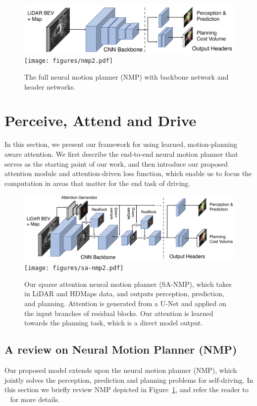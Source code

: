 \begin{figure}[t]
  \centering
  \iflatexml
  \includegraphics[width=6\textwidth]{figures/nmp2.png}
  \else
  \texttt{[image: figures/nmp2.pdf]}
  \fi
  \caption{\small The full neural motion planner (NMP) \cite{nmp} with backbone network and header networks.}
  \label{fig:nmp}
  \vspace{-0.15in}
\end{figure}
\section{Perceive, Attend and Drive}
In this section, we present our framework for using learned, motion-planning aware attention.
We first describe  the end-to-end neural motion planner that serves as the
starting point of our work, and then introduce our proposed attention module and
attention-driven loss function, which enable us to focus the computation in areas that matter for the end task of driving.

\begin{figure}[t]
  \centering
  \iflatexml
  \includegraphics[width=6\textwidth]{figures/sa-nmp2.png}
  \else
  \texttt{[image: figures/sa-nmp2.pdf]}
  \fi
  \caption{\small Our sparse attention neural motion planner (SA-NMP), which takes in LiDAR and HDMaps
  data, and outputs perception, prediction, and planning. Attention is generated from a U-Net and
  applied on the input branches of residual blocks. Our attention is learned towards the planning task, which is a direct model output.}
  \label{fig:mainfig}
  \vspace{-0.15in}
\end{figure}

\subsection{A review on Neural Motion Planner (NMP)}
Our proposed model extends upon the neural motion planner (NMP), which jointly solves the
perception, prediction and planning problems for self-driving. In this section we briefly review NMP depicted in Figure~\ref{fig:nmp}, and refer the reader to ~\cite{nmp} for more details.

